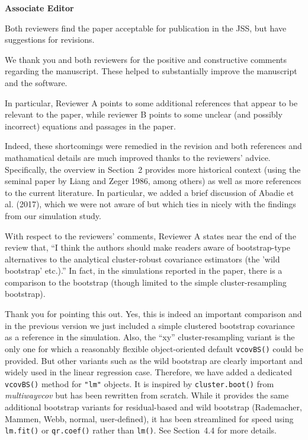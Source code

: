 \documentclass[american,foldmarks=false]{uibklttr}
\let\code=\texttt
\newenvironment{review}{\fontshape{\itdefault}\fontseries{\bfdefault} \selectfont \smallskip}{\par}
\begin{document}
\newpage


\textbf{\LARGE Associate Editor}

\begin{review}
Both reviewers find the paper acceptable for publication in the
JSS, but have suggestions for revisions.
\end{review}

We thank you and both reviewers for the positive and constructive comments regarding
the manuscript. These helped to substantially improve the manuscript and the
software.



\begin{review}
In particular, Reviewer A points to some additional references
that appear to be relevant to the paper, while reviewer B points to some unclear
(and possibly incorrect) equations and passages in the paper.
\end{review}

Indeed, these shortcomings were remedied in the revision and both references and
mathamatical details are much improved thanks to the reviewers' advice.
Specifically, the overview in Section~2 provides more historical context
(using the seminal paper by Liang and Zeger 1986, among others) as well as more
references to the current literature. In particular, we added a brief discussion
of Abadie et al. (2017), which we were not aware of but which ties in nicely with
the findings from our simulation study.


\begin{review}
With respect to the reviewers' comments, Reviewer A states near
the end of the review that, ``I think the authors should make readers aware of
bootstrap-type alternatives to the analytical cluster-robust covariance
estimators (the 'wild bootstrap' etc.).'' In fact, in the simulations reported
in the paper, there is a comparison to the bootstrap (though limited to the
simple cluster-resampling bootstrap).
\end{review}

Thank you for pointing this out. Yes, this is indeed an important comparison and
in the previous version we just included a simple clustered bootstrap covariance
as a reference in the simulation. Also, the ``xy'' cluster-resampling variant is
the only one for which a reasonably flexible object-oriented default
\code{vcovBS()} could be provided. But other variants such as the wild bootstrap
are clearly important and widely used in the linear regression case. Therefore,
we have added a dedicated \code{vcovBS()} method for \code{"lm"} objects. It is
inspired by \code{cluster.boot()} from \emph{multiwayvcov} but has been rewritten
from scratch. While it provides the same additional bootstrap variants for residual-based
and wild bootstrap (Rademacher, Mammen, Webb, normal, user-defined), it has
been streamlined for speed using \code{lm.fit()} or \code{qr.coef()} rather than
\code{lm()}. See Section~4.4 for more details.
\end{document}
